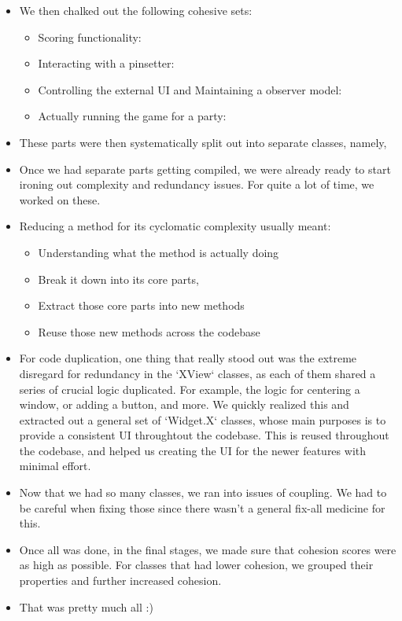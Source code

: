 \begin{itemize}
    \item We then chalked out the following cohesive sets:
          \begin{itemize}
              \item Scoring functionality: 
              \item Interacting with a pinsetter: 
              \item Controlling the external UI and Maintaining a observer model: 
              \item Actually running the game for a party: 
          \end{itemize}

    \item These parts were then systematically split out into separate classes, namely, 
    \item Once we had separate parts getting compiled, we were already ready to start ironing out complexity and redundancy issues. For quite a lot of time, we worked on these.
    \item Reducing a method for its cyclomatic complexity usually meant:
          \begin{itemize}
              \item Understanding what the method is actually doing
              \item Break it down into its core parts,
              \item Extract those core parts into new methods
              \item Reuse those new methods across the codebase
          \end{itemize}
    \item For code duplication, one thing that really stood out was the extreme disregard for redundancy in the `XView` classes, as each of them shared a series of crucial logic duplicated. For example, the logic for centering a window, or adding a button, and more. We quickly realized this and extracted out a general set of `Widget.X` classes, whose main purposes is to provide a consistent UI throughtout the codebase. This is reused throughout the codebase, and helped us creating the UI for the newer features with minimal effort.
    \item Now that we had so many classes, we ran into issues of coupling. We had to be careful when fixing those since there wasn't a general fix-all medicine for this.
    \item Once all was done, in the final stages, we made sure that cohesion scores were as high as possible. For classes that had lower cohesion, we grouped their properties and further increased cohesion.
    \item That was pretty much all :)
\end{itemize}

